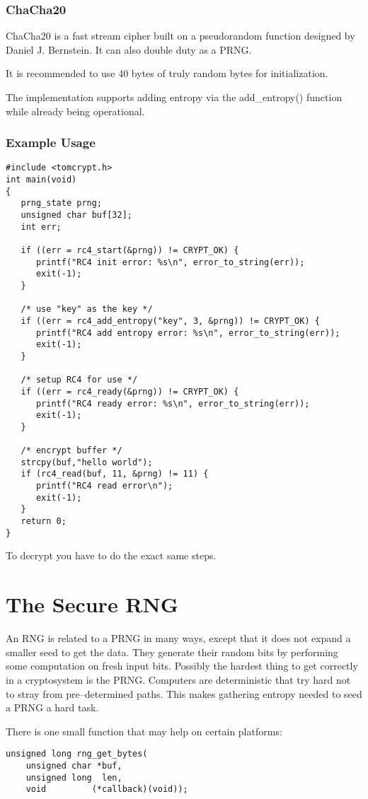 \documentclass[synpaper]{book}
\newcommand{\mysection}[1]    %
	{                   %
	\section{#1}
   \markboth{\textsf{www.libtom.net}}{\thesection ~ {#1}}
	}
\begin{document}
\subsubsection{ChaCha20}

ChaCha20 is a fast stream cipher built on a pseudorandom function designed by Daniel J. Bernstein.
It can also double duty as a PRNG.

It is recommended to use 40 bytes of truly random bytes for initialization.

The implementation supports adding entropy via the add\_entropy() function while already being operational.

\subsubsection{Example Usage}
\begin{small}
\begin{verbatim}
#include <tomcrypt.h>
int main(void)
{
   prng_state prng;
   unsigned char buf[32];
   int err;

   if ((err = rc4_start(&prng)) != CRYPT_OK) {
      printf("RC4 init error: %s\n", error_to_string(err));
      exit(-1);
   }

   /* use "key" as the key */
   if ((err = rc4_add_entropy("key", 3, &prng)) != CRYPT_OK) {
      printf("RC4 add entropy error: %s\n", error_to_string(err));
      exit(-1);
   }

   /* setup RC4 for use */
   if ((err = rc4_ready(&prng)) != CRYPT_OK) {
      printf("RC4 ready error: %s\n", error_to_string(err));
      exit(-1);
   }

   /* encrypt buffer */
   strcpy(buf,"hello world");
   if (rc4_read(buf, 11, &prng) != 11) {
      printf("RC4 read error\n");
      exit(-1);
   }
   return 0;
}
\end{verbatim}
\end{small}
To decrypt you have to do the exact same steps.

\mysection{The Secure RNG}
An RNG is related to a PRNG in many ways, except that it does not expand a smaller seed to get the data.  They generate their random bits
by performing some computation on fresh input bits.  Possibly the hardest thing to get correctly in a cryptosystem is the
PRNG.  Computers are deterministic that try hard not to stray from pre--determined paths.  This makes gathering entropy needed to seed a PRNG
a hard task.

There is one small function that may help on certain platforms:
\begin{verbatim}
unsigned long rng_get_bytes(
    unsigned char *buf,
    unsigned long  len,
    void         (*callback)(void));
\end{verbatim}
\end{document}
